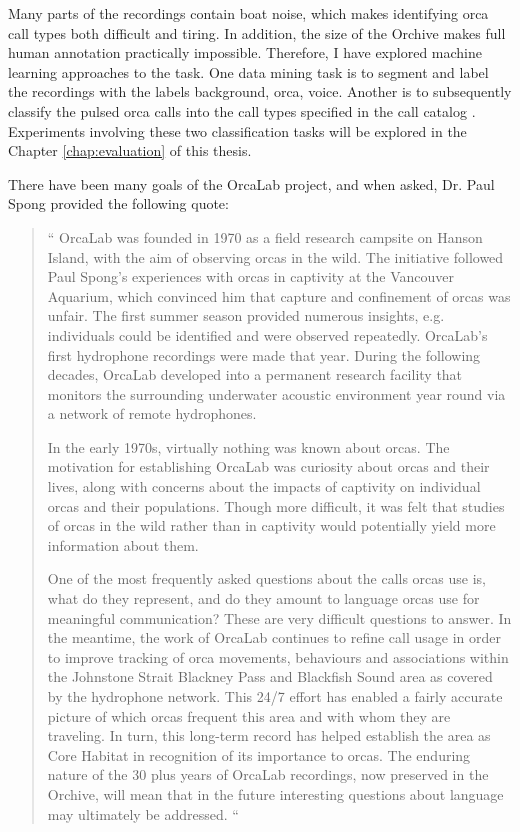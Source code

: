 \documentclass[12pt,oneside]{book}
\begin{document}
Many parts of the recordings contain boat noise, which makes
identifying orca call types both difficult and tiring. In addition,
the size of the Orchive makes full human annotation practically
impossible. Therefore, I have explored machine learning approaches to
the task.  One data mining task is to segment and label the recordings
with the labels background, orca, voice. Another is to subsequently
classify the pulsed orca calls into the call types specified in the
call catalog \cite{ford1987catalogue}.  Experiments involving these
two classification tasks will be explored in the Chapter
\ref{chap:evaluation} of this thesis.

There have been many goals of the OrcaLab project, and when asked,
Dr. Paul Spong provided the following quote:

\begin{quote}
`` OrcaLab was founded in 1970 as a field research campsite on Hanson
  Island, with the aim of observing orcas in the wild. The initiative
  followed Paul Spong's experiences with orcas in captivity at the
  Vancouver Aquarium, which convinced him that capture and confinement
  of orcas was unfair. The first summer season provided numerous
  insights, e.g. individuals could be identified and were observed
  repeatedly. OrcaLab's first hydrophone recordings were made that
  year. During the following decades, OrcaLab developed into a
  permanent research facility that monitors the surrounding underwater
  acoustic environment year round via a network of remote hydrophones.

  In the early 1970s, virtually nothing was known about orcas. The
  motivation for establishing OrcaLab was curiosity about orcas and
  their lives, along with concerns about the impacts of captivity on
  individual orcas and their populations. Though more difficult, it
  was felt that studies of orcas in the wild rather than in captivity
  would potentially yield more information about them.

  One of the most frequently asked questions about the calls orcas use
  is, what do they represent, and do they amount to language orcas use
  for meaningful communication? These are very difficult questions to
  answer.  In the meantime, the work of OrcaLab continues to refine
  call usage in order to improve tracking of orca movements,
  behaviours and associations within the Johnstone Strait Blackney
  Pass and Blackfish Sound area as covered by the hydrophone network.
  This 24/7 effort has enabled a fairly accurate picture of which
  orcas frequent this area and with whom they are traveling.  In
  turn, this long-term record has helped establish the area as Core
  Habitat in recognition of its importance to orcas.  The enduring
  nature of the 30 plus years of OrcaLab recordings, now preserved in
  the Orchive, will mean that in the future interesting questions
  about language may ultimately be addressed.  ``
\end{quote}
\end{document}
